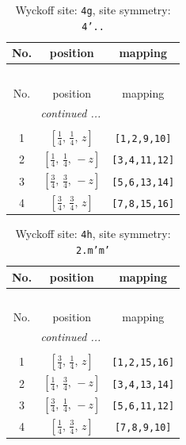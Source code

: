 \documentclass[fleqn,8pt]{jsarticle}
\begin{document}
\renewcommand{\arraystretch}{1.2}
\begin{longtable}{ccc}
\caption{Wyckoff site: {\tt 4g}, site symmetry: {\tt 4'..}}
 \\
 \hline \hline
No. & position & mapping \\ \hline \endfirsthead

\multicolumn{2}{l}{\tablename\ \thetable{}} \\
 \hline \hline
No. & position & mapping \\ \hline \endhead

 \hline \hline
\multicolumn{2}{r}{\footnotesize\it continued ...} \\ \endfoot

 \hline \hline
\multicolumn{2}{r}{} \\ \endlastfoot

1 & $\left[ \frac{1}{4},\, \frac{1}{4},\, z \right]$ & {\tt [1,2,9,10]} \\ \hline
2 & $\left[ \frac{1}{4},\, \frac{1}{4},\, - z \right]$ & {\tt [3,4,11,12]} \\ \hline
3 & $\left[ \frac{3}{4},\, \frac{3}{4},\, - z \right]$ & {\tt [5,6,13,14]} \\ \hline
4 & $\left[ \frac{3}{4},\, \frac{3}{4},\, z \right]$ & {\tt [7,8,15,16]} \\
\end{longtable}
\renewcommand{\arraystretch}{1.2}
\begin{longtable}{ccc}
\caption{Wyckoff site: {\tt 4h}, site symmetry: {\tt 2.m'm'}}
 \\
 \hline \hline
No. & position & mapping \\ \hline \endfirsthead

\multicolumn{2}{l}{\tablename\ \thetable{}} \\
 \hline \hline
No. & position & mapping \\ \hline \endhead

 \hline \hline
\multicolumn{2}{r}{\footnotesize\it continued ...} \\ \endfoot

 \hline \hline
\multicolumn{2}{r}{} \\ \endlastfoot

1 & $\left[ \frac{3}{4},\, \frac{1}{4},\, z \right]$ & {\tt [1,2,15,16]} \\ \hline
2 & $\left[ \frac{1}{4},\, \frac{3}{4},\, - z \right]$ & {\tt [3,4,13,14]} \\ \hline
3 & $\left[ \frac{3}{4},\, \frac{1}{4},\, - z \right]$ & {\tt [5,6,11,12]} \\ \hline
4 & $\left[ \frac{1}{4},\, \frac{3}{4},\, z \right]$ & {\tt [7,8,9,10]} \\
\end{longtable}
\end{document}
